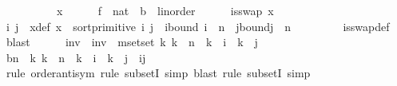 \begin{isabellebody}
\ \ \isamarkupfalse%
\ {\isacharminus}{\kern0pt}\isanewline
\ \ \ \ \isamarkupfalse%
\ x\isanewline
\ \ \ \ \isamarkupfalse%
\ f\ {\isacharcolon}{\kern0pt}{\isacharcolon}{\kern0pt}\ {\isachardoublequoteopen}nat\ {\isasymRightarrow}\ {\isacharprime}{\kern0pt}b\ {\isacharcolon}{\kern0pt}{\isacharcolon}{\kern0pt}\ linorder{\isachardoublequoteclose}\isanewline
\ \ \ \ \isamarkupfalse%
\ {\isachardoublequoteopen}is{\isacharunderscore}{\kern0pt}swap\ x{\isachardoublequoteclose}\isanewline
\ \ \ \ \isamarkupfalse%
\ \isamarkupfalse%
\ i\ j\ \ x{\isacharunderscore}{\kern0pt}def{\isacharcolon}{\kern0pt}\ {\isachardoublequoteopen}x\ {\isacharequal}{\kern0pt}\ sort{\isacharunderscore}{\kern0pt}primitive\ i\ j{\isachardoublequoteclose}\ \ i{\isacharunderscore}{\kern0pt}bound{\isacharcolon}{\kern0pt}\ {\isachardoublequoteopen}i\ {\isacharless}{\kern0pt}\ n{\isachardoublequoteclose}\ \ j{\isacharunderscore}{\kern0pt}bound{\isacharcolon}{\kern0pt}{\isachardoublequoteopen}j\ {\isacharless}{\kern0pt}\ n{\isachardoublequoteclose}\ \isanewline
\ \ \ \ \ \ \isamarkupfalse%
\ is{\isacharunderscore}{\kern0pt}swap{\isacharunderscore}{\kern0pt}def\ \isamarkupfalse%
\ blast\isanewline
\ \ \ \ \isamarkupfalse%
\ inv\ \ {\isachardoublequoteopen}inv\ {\isacharequal}{\kern0pt}\ mset{\isacharunderscore}{\kern0pt}set\ {\isacharbraceleft}{\kern0pt}k{\isachardot}{\kern0pt}\ k\ {\isacharless}{\kern0pt}\ n\ {\isasymand}\ k\ {\isasymnoteq}\ i\ {\isasymand}\ k\ {\isasymnoteq}\ j{\isacharbraceright}{\kern0pt}{\isachardoublequoteclose}\isanewline
\ \ \ \ \isamarkupfalse%
\ b{\isacharcolon}{\kern0pt}{\isachardoublequoteopen}{\isacharbraceleft}{\kern0pt}{}{\isachardot}{\kern0pt}{\isachardot}{\kern0pt}{\isacharless}{\kern0pt}n{\isacharbraceright}{\kern0pt}\ {\isacharequal}{\kern0pt}\ {\isacharbraceleft}{\kern0pt}k{\isachardot}{\kern0pt}\ k\ {\isacharless}{\kern0pt}\ n\ {\isasymand}\ k\ {\isasymnoteq}\ i\ {\isasymand}\ k\ {\isasymnoteq}\ j{\isacharbraceright}{\kern0pt}\ {\isasymunion}\ {\isacharbraceleft}{\kern0pt}i{\isacharcomma}{\kern0pt}j{\isacharbraceright}{\kern0pt}{\isachardoublequoteclose}\isanewline
\ \ \ \ \ \ \isamarkupfalse%
\ {\isacharparenleft}{\kern0pt}rule\ order{\isacharunderscore}{\kern0pt}antisym{\isacharcomma}{\kern0pt}\ rule\ subsetI{\isacharcomma}{\kern0pt}\ simp{\isacharcomma}{\kern0pt}\ blast{\isacharcomma}{\kern0pt}\ rule\ subsetI{\isacharcomma}{\kern0pt}\ simp{\isacharparenright}{\kern0pt}\isanewline

\end{isabellebody}
